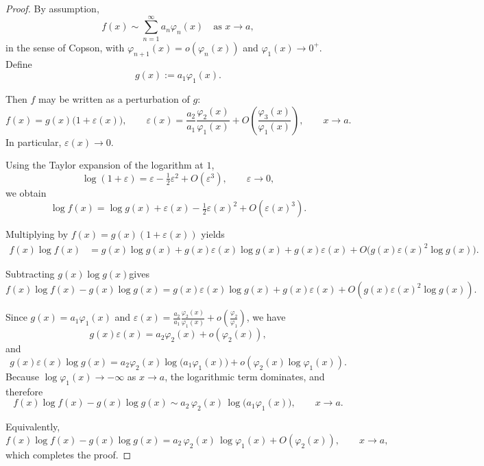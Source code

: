 \documentclass{article}
\theoremstyle{definition}
\begin{document}
\begin{proof}
By assumption,
\[
f(x)\sim \sum_{n=1}^\infty a_n\varphi_n(x)
\quad \text{as } x\to a,
\]
in the sense of Copson, with $\varphi_{n+1}(x)=o(\varphi_n(x))$ and
$\varphi_1(x)\to0^+$.  Define
\[
g(x):=a_1\varphi_1(x).
\]

Then $f$ may be written as a perturbation of $g$:
\[
f(x)=g(x)\bigl(1+\varepsilon(x)\bigr),
\qquad
\varepsilon(x)
=
\frac{a_2}{a_1}\frac{\varphi_2(x)}{\varphi_1(x)}
+
O\!\left(\frac{\varphi_3(x)}{\varphi_1(x)}\right),
\qquad x\to a.
\]
In particular, $\varepsilon(x)\to0$.

Using the Taylor expansion of the logarithm at $1$,
\[
\log(1+\varepsilon)
=
\varepsilon-\tfrac12\varepsilon^2+O(\varepsilon^3),
\qquad \varepsilon\to0,
\]
we obtain
\[
\log f(x)
=
\log g(x)
+
\varepsilon(x)
-
\tfrac12\varepsilon(x)^2
+
O(\varepsilon(x)^3).
\]

Multiplying by $f(x)=g(x)(1+\varepsilon(x))$ yields
\[
\begin{aligned}
f(x)\log f(x)
&=
g(x)\log g(x)
+
g(x)\varepsilon(x)\log g(x)
+
g(x)\varepsilon(x)
+
O\bigl(g(x)\varepsilon(x)^2\log g(x)\bigr).
\end{aligned}
\]

Subtracting \(g(x)\log g(x)\)gives
\[
f(x)\log f(x)-g(x)\log g(x)=g(x)\varepsilon(x)\log g(x)
+g(x)\varepsilon(x)+
O\left(g(x)\varepsilon(x)^2\log g(x)\right).
\]

Since $g(x)=a_1\varphi_1(x)$ and
$\varepsilon(x)=\frac{a_2}{a_1}\frac{\varphi_2(x)}{\varphi_1(x)}+o\!\left(\frac{\varphi_2}{\varphi_1}\right)$,
we have
\[
g(x)\varepsilon(x)
=
a_2\varphi_2(x)
+
o\!\left(\varphi_2(x)\right),
\]
and
\[
g(x)\varepsilon(x)\log g(x)
=
a_2\varphi_2(x)\log\bigl(a_1\varphi_1(x)\bigr)
+
o\!\left(\varphi_2(x)\log\varphi_1(x)\right).
\]
Because $\log\varphi_1(x)\to-\infty$ as $x\to a$, the logarithmic term dominates,
and therefore
\[
f(x)\log f(x)-g(x)\log g(x)
\sim
a_2\,\varphi_2(x)\,\log\bigl(a_1\varphi_1(x)\bigr),
\qquad x\to a.
\]

Equivalently,
\[
f(x)\log f(x)-g(x)\log g(x)
=
a_2\,\varphi_2(x)\,\log\varphi_1(x)
+
O\!\left(\varphi_2(x)\right),
\qquad x\to a,
\]
which completes the proof.
\end{proof}
\end{document}
